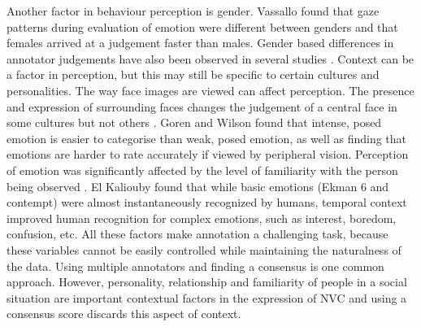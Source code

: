 Another factor in behaviour perception is gender. Vassallo \etal \cite{Vassallo2009} found that gaze patterns during evaluation of emotion were different between genders and that females arrived at a judgement faster than males. Gender based differences in annotator judgements have also been observed in several studies \cite{Buck1979, Terracciano2003, Abrilian2006}. Context can be a factor in perception, but this may still be specific to certain cultures and personalities. The way face images are viewed can affect perception. The presence and expression of surrounding faces changes the judgement of a central face in some cultures but not others \cite{Masuda2008}. Goren and Wilson \cite{Goren2006} found that intense, posed emotion is easier to categorise than weak, posed emotion, as well as finding that emotions are harder to rate accurately if viewed by peripheral vision. Perception of emotion was significantly affected by the level of familiarity with the person being observed \cite{Hoque2009}. El Kaliouby \etal \cite{ElKaliouby03} found that while basic emotions (Ekman 6 and contempt) were almost instantaneously recognized by humans, temporal context improved human recognition for complex emotions, such as interest, boredom, confusion, etc. All these factors make annotation a challenging task, because these variables cannot be easily controlled while maintaining the naturalness of the data. Using multiple annotators and finding a consensus is one common approach. However, personality, relationship and familiarity of people in a social situation are important contextual factors in the expression of \ac{NVC} and using a consensus score discards this aspect of context.







